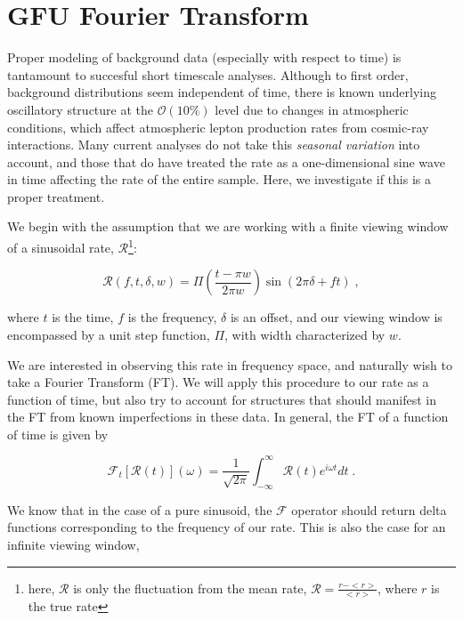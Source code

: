 \chapter{GFU Fourier Transform}

Proper modeling of background data (especially with respect to time) is tantamount to succesful short timescale analyses. Although to first order, background distributions seem independent of time, there is known underlying oscillatory structure at the $\mathcal{O}(10\%)$ level due to changes in atmospheric conditions, which affect atmospheric lepton production rates from cosmic-ray interactions. Many current analyses do not take this \textit{seasonal variation} into account, and those that do have treated the rate as a one-dimensional sine wave in time affecting the rate of the entire sample. Here, we investigate if this is a proper treatment. 

We begin with the assumption that we are working with a finite viewing window of a sinusoidal rate, $\mathcal{R}$\footnote{here, $\mathcal{R}$ is only the fluctuation from the mean rate, $\mathcal{R} = \frac{r-<r>}{<r>}$, where $r$ is the true rate}:

\begin{equation}
\label{eq:rate}
    \mathcal{R}(f,t,\delta, w) = \Pi \left(\frac{t-\pi  w}{2 \pi  w}\right) \sin (2 \pi  \delta +f t) \; , 
\end{equation}

where $t$ is the time, $f$ is the frequency, $\delta$ is an offset, and our viewing window is encompassed by a unit step function, $\Pi$, with width characterized by $w$. 

We are interested in observing this rate in frequency space, and naturally wish to take a Fourier Transform (FT). We will apply this procedure to our rate as a function of time, but also try to account for structures that should manifest in the FT from known imperfections in these data. In general, the FT of a function of time is given by

\begin{equation}
\label{eq:FFT}
    \mathcal{F}_t[\mathcal{R}(t)](\omega ) = \frac{1}{\sqrt{2 \pi}} \int_{-\infty}^{\infty} \mathcal{R}(t) e^{i \omega t} d t \; .
\end{equation}

We know that in the case of a pure sinusoid, the $\mathcal{F}$ operator should return delta functions corresponding to the frequency of our rate. This is also the case for an infinite viewing window,


